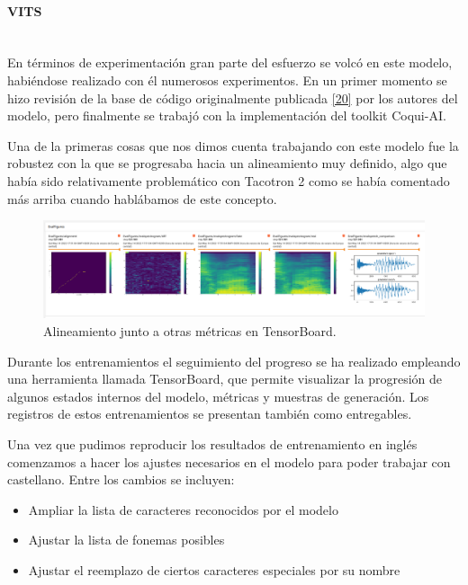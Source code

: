 \paragraph{VITS} ~\\

En términos de experimentación gran parte del esfuerzo se volcó en este modelo, habiéndose realizado con él numerosos experimentos. En un primer momento se hizo revisión de la base de código originalmente publicada \hyperref[RES_6]{[20]} por los autores del modelo, pero finalmente se trabajó con la implementación del toolkit Coqui-AI.

Una de la primeras cosas que nos dimos cuenta trabajando con este modelo fue la robustez con la que se progresaba hacia un alineamiento muy definido, algo que había sido relativamente problemático con Tacotron 2 como se había comentado más arriba cuando hablábamos de este concepto.

\begin{figure}[H]
\centering
\includegraphics[width=14cm]{5_resultados_img/vits-2.png}
\caption{Alineamiento junto a otras métricas en TensorBoard.}
\label{fig:figure1}
\end{figure}

Durante los entrenamientos el seguimiento del progreso se ha realizado empleando una herramienta llamada TensorBoard, que permite visualizar la progresión de algunos estados internos del modelo, métricas y muestras de generación. Los registros de estos entrenamientos se presentan también como entregables.

Una vez que pudimos reproducir los resultados de entrenamiento en inglés comenzamos a hacer los ajustes necesarios en el modelo para poder trabajar con castellano. Entre los cambios se incluyen:

\begin{itemize}
    \item Ampliar la lista de caracteres reconocidos por el modelo
    \item Ajustar la lista de fonemas posibles
    \item Ajustar el reemplazo de ciertos caracteres especiales por su nombre
\end{itemize}

